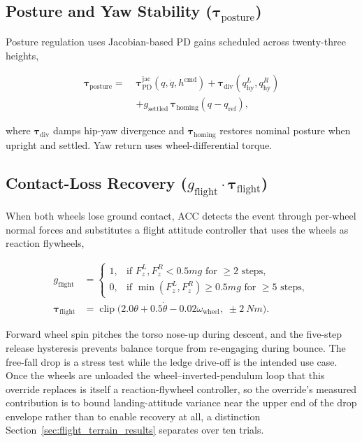 \documentclass[a4paper,fleqn]{cas-dc}
\begin{document}
\subsection{Posture and Yaw Stability ($\boldsymbol{\tau}_{\text{posture}}$)}
\label{sec:posture}

Posture regulation uses Jacobian-based PD gains scheduled across twenty-three
heights,

\begin{equation}
\begin{split}
\boldsymbol{\tau}_{\text{posture}} =\;&
\boldsymbol{\tau}_{\text{PD}}^{\text{jac}}(q,\dot{q},h^{\text{cmd}})
+ \boldsymbol{\tau}_{\text{div}}(q_{\text{hy}}^L,q_{\text{hy}}^R)\\
&+ g_{\text{settled}}\,\boldsymbol{\tau}_{\text{homing}}(q-q_{\text{ref}}),
\end{split}
\label{eq:posture}
\end{equation}

where $\boldsymbol{\tau}_{\text{div}}$ damps hip-yaw divergence and $\boldsymbol{\tau}_{\text{homing}}$ restores nominal posture when upright and settled.
Yaw return uses wheel-differential torque.

\subsection{Contact-Loss Recovery ($g_{\text{flight}}\!\cdot\!\boldsymbol{\tau}_{\text{flight}}$)}
\label{sec:flight}

When both wheels lose ground contact, ACC detects the event through per-wheel
normal forces and substitutes a flight attitude controller that uses the wheels
as reaction flywheels,

\begin{align}
g_{\text{flight}} &= \begin{cases}
1, & \text{if } F_z^L, F_z^R < 0.5mg \text{ for } {\geq} 2 \text{ steps},\\
0, & \text{if } \min(F_z^L,F_z^R) \geq 0.5mg \text{ for } {\geq} 5 \text{ steps},
\end{cases}\\[2pt]
\boldsymbol{\tau}_{\text{flight}} &= \operatorname{clip}\!\big(2.0\theta + 0.5\dot{\theta} - 0.02\omega_{\text{wheel}},\;\pm\SI{2}{Nm}\big).
\label{eq:flight}
\end{align}

Forward wheel spin pitches the torso nose-up during descent, and the five-step
release hysteresis prevents balance torque from re-engaging during bounce. The
free-fall drop is a stress test while the ledge drive-off is the intended use
case. Once the wheels are unloaded the wheel--inverted-pendulum loop that this
override replaces is itself a reaction-flywheel controller, so the override's
measured contribution is to bound landing-attitude variance near the upper end
of the drop envelope rather than to enable recovery at all, a distinction
Section~\ref{sec:flight_terrain_results} separates over ten trials.
\end{document}
